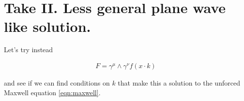 \documentclass{article}
\begin{document}
\section{ Take II.  Less general plane wave like solution. }

Let's try instead

\begin{align*}
F = \gamma^\mu \wedge \gamma^\nu f( x \cdot k )
\end{align*}

and see if we can find conditions on $k$ that make this a solution to the unforced Maxwell equation \ref{eqn:maxwell}.

%
%
%
\end{document}
